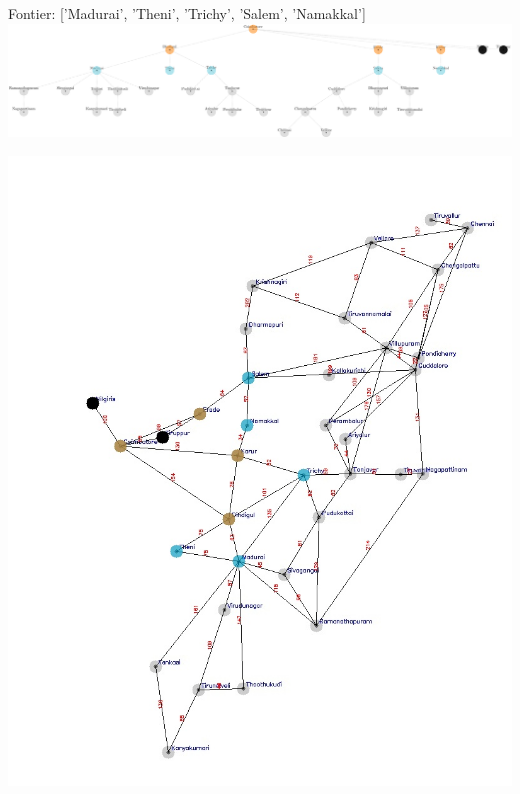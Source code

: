 \documentclass[xcolor=table]{beamer}
\begin{document}
\begin{frame}
  { \tiny Fontier: ['Madurai', 'Theni', 'Trichy', 'Salem', 'Namakkal'] }
  \includegraphics[width=1\textwidth]{../BFSNodes/10-1.png}
  \begin{center}
    \includegraphics[height=0.6\textheight]{../BFSoutput/tamilBFS8.jpg}
  \end{center}
\end{frame}
\end{document}
